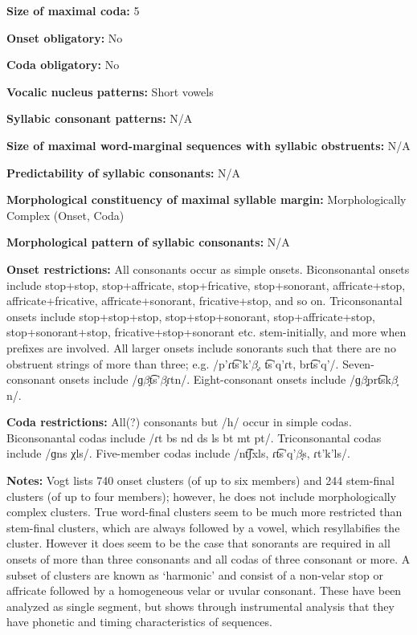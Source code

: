 \textbf{Size of maximal coda:} 5



\textbf{Onset obligatory:} No



\textbf{Coda obligatory:} No



\textbf{Vocalic nucleus patterns:} Short vowels



\textbf{Syllabic consonant patterns:} N/A



\textbf{Size of maximal word{}-marginal sequences with syllabic obstruents:} N/A



\textbf{Predictability of syllabic consonants:} N/A



\textbf{Morphological constituency of maximal syllable margin:} Morphologically Complex (Onset, Coda)



\textbf{Morphological pattern of syllabic consonants:} N/A



\textbf{Onset restrictions:} All consonants occur as simple onsets. Biconsonantal onsets include stop+stop, stop+affricate, stop+fricative, stop+sonorant, affricate+stop, affricate+fricative, affricate+sonorant, fricative+stop, and so on. Triconsonantal onsets include stop+stop+stop, stop+stop+sonorant, stop+affricate+stop, stop+sonorant+stop, fricative+stop+sonorant etc. stem-initially, and more when prefixes are involved. All larger onsets include sonorants such that there are no obstruent strings of more than three; e.g. /p’ɾt͡s’k'$\beta ̞$, t͡s’q’ɾt, brt͡s'q{}'/. Seven-consonant onsets include /ɡ$\beta ̞$t͡s’$\beta ̞ɾ$tn/. Eight-consonant onsets include /ɡ$\beta ̞$prt͡sk$\beta ̞$n/.



\textbf{Coda restrictions:} All(?) consonants but /h/ occur in simple codas. Biconsonantal codas include /ɾt bs nd ds ls bt mt pt/. Triconsonantal codas include /ɡns χls/. Five-member codas include /nt͡ʃxls, ɾt͡s’q’$\beta ̞$s, ɾt'k'ls/.



\textbf{Notes:} Vogt lists 740 onset clusters (of up to six members) and 244 stem-final clusters (of up to four members); however, he does not include morphologically complex clusters. True word-final clusters seem to be much more restricted than stem-final clusters, which are always followed by a vowel, which resyllabifies the cluster. However it does seem to be the case that sonorants are required in all onsets of more than three consonants and all codas of three consonant or more. A subset of clusters are known as ‘harmonic’ and consist of a non-velar stop or affricate followed by a homogeneous velar or uvular consonant. These have been analyzed as single segment, but \citet{Chitoran1998} shows through instrumental analysis that they have phonetic and timing characteristics of sequences.



